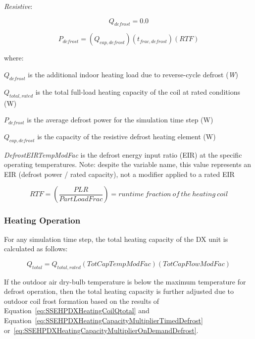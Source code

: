 \emph{Resistive}:

\begin{equation}
{Q_{defrost}} = 0.0
\end{equation}

\begin{equation}
{P_{defrost}} = \left( {{Q_{cap,defrost}}} \right)\left( {{t_{frac,defrost}}} \right)\left( {RTF} \right)
\end{equation}

where:

\({Q_{defrost}}\) is the additional indoor heating load due to reverse-cycle defrost (\emph{W})

\({Q_{total,rated}}\) is the total full-load heating capacity of the coil at rated conditions (W)

\({P_{defrost}}\) is the average defrost power for the simulation time step (W)

\({Q_{cap,defrost}}\) is the capacity of the resistive defrost heating element (W)

\emph{DefrostEIRTempModFac} is the defrost energy input ratio (EIR) at the specific operating temperatures. Note: despite the variable name, this value represents an EIR (defrost power / rated capacity), not a modifier applied to a rated EIR

\begin{equation}
RTF = \left( \frac{PLR}{PartLoadFrac} \right) = runtime~fraction~of~the~heating~coil
\end{equation}

\subsubsection{Heating Operation}\label{heating-operation-000}

For any simulation time step, the total heating capacity of the DX unit is calculated as follows:

\begin{equation}
Q_{total} = Q_{total,rated}\left( {TotCapTempModFac} \right)\left( {TotCapFlowModFac} \right)
\label{eq:SSEHPDXHeatingCoilQtotal}
\end{equation}

If the outdoor air dry-bulb temperature is below the maximum temperature for defrost operation, then the total heating capacity is further adjusted due to outdoor coil frost formation based on the results of Equation~\ref{eq:SSEHPDXHeatingCoilQtotal} and Equation~\ref{eq:SSEHPDXHeatingCapacityMultiplierTimedDefrost} or~\ref{eq:SSEHPDXHeatingCapacityMultiplierOnDemandDefrost}.

